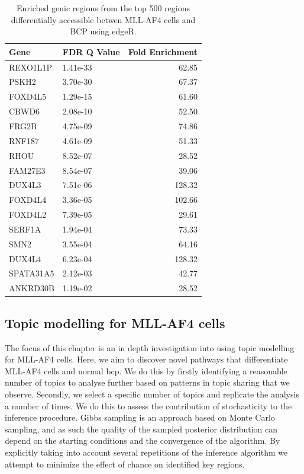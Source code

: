 \begin{table}

    \caption{\label{tab:table:mll_edger_genes}Enriched genic regions from the top 500 regions differentially accessible betwen MLL-AF4 cells and BCP using edgeR.}
    \centering
    \begin{tabular}[t]{llr}
    \toprule
    Gene & FDR Q Value & Fold Enrichment\\
    \midrule
    REXO1L1P & 1.41e-33 & 62.85\\ %
    PSKH2 & 3.70e-30 & 67.37\\ 
    FOXD4L5 & 1.29e-15 & 61.60\\
    CBWD6 & 2.08e-10 & 52.50\\
    FRG2B & 4.75e-09 & 74.86\\
    \addlinespace
    RNF187 & 4.61e-09 & 51.33\\
    RHOU & 8.52e-07 & 28.52\\
    FAM27E3 & 8.54e-07 & 39.06\\
    DUX4L3 & 7.51e-06 & 128.32\\
    FOXD4L4 & 3.36e-05 & 102.66\\
    \addlinespace
    FOXD4L2 & 7.39e-05 & 29.61\\
    SERF1A & 1.94e-04 & 73.33\\
    SMN2 & 3.55e-04 & 64.16\\
    DUX4L4 & 6.23e-04 & 128.32\\
    SPATA31A5 & 2.12e-03 & 42.77\\
    \addlinespace
    ANKRD30B & 1.19e-02 & 28.52\\
    \bottomrule
    \end{tabular}
\end{table}

\subsection{Topic modelling for MLL-AF4 cells}

The focus of this chapter is an in depth investigation into using topic modelling for MLL-AF4 cells. Here, we aim to discover novel pathways that differentiate MLL-AF4 cells and normal \gls{bcp}. We do this by firstly identifying a reasonable number of topics to analyse further based on patterns in topic sharing that we observe. Secondly, we select a specific number of topics and replicate the analysis a number of times. We do this to assess the contribution of stochasticity to the inference procedure. Gibbs sampling is an approach based on Monte Carlo sampling, and as such the quality of the sampled posterior distribution can depend on the starting conditions and the convergence of the algorithm. By explicitly taking into account several repetitions of the inference algorithm we attempt to minimize the effect of chance on identified key regions. 


